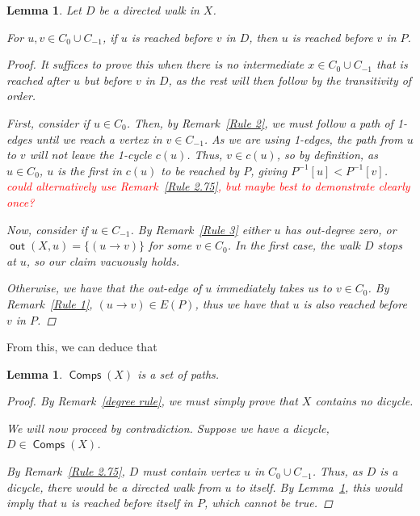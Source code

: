 \documentclass{article}
\newtheorem{lem}[result]{Lemma}
\theoremstyle{definition}
\DeclareMathOperator{\out}{\bm{\mathsf{out}}}
\DeclareMathOperator{\Comp}{\bm{\mathsf{Comps}}}
\newcommand{\hide}[1]{}
\newcommand{\edit}[1]{\textcolor{red}{#1}}
\begin{document}
\begin{lem}\label{walking} Let $D$ be a directed walk in $X$.

For $u,v \in C_0 \cup C_{-1}$, if $u$ is reached before $v$ in $D$, then $u$ is reached before $v$ in $P$.
\begin{proof}

It suffices to prove this when there is no intermediate $x \in C_0 \cup C_{-1}$ that is reached after $u$ but before $v$ in $D$, as the rest will then follow by the transitivity of order.

\vspace{.75em}
First, consider if $u \in C_0$. Then, by Remark~\ref{Rule 2}, we must follow a path of 1-edges until we reach a vertex in $v \in C_{-1}$. As we are using 1-edges, the path from $u$ to $v$ will not leave the 1-cycle $c(u)$. Thus, $v \in c(u)$, so by definition, as $u \in C_0$, $u$ is the first in $c(u)$ to be reached by $P$, giving $P^{-1}[u]<P^{-1}[v]$.\edit{ could alternatively use Remark~\ref{Rule 2.75}, but maybe best to demonstrate clearly once?}

\vspace{.75em}
Now, consider if $u \in C_{-1}$. By Remark~\ref{Rule 3} either $u$ has out-degree zero, or $\out(X,u) = \{(u \to v)\}$ for some $v \in C_0$. In the first case, the walk $D$ stops at $u$, so our claim vacuously holds. 

Otherwise, we have that the out-edge of $u$ immediately takes us to $v \in C_0$. By Remark~\ref{Rule 1}, $(u \to v) \in E(P)$, thus we have that $u$ is also reached before $v$ in $P$.
\end{proof}
\end{lem}

\vspace{1.75em}
From this, we can deduce that 
\begin{lem} \label{path rule} $\Comp(X)$ is a set of paths.

\begin{proof} By Remark~\ref{degree rule}, we must simply prove that $X$ contains no dicycle. \hide{Also by 3.1, we note that directed walks along $X$ are unique, meaning, that starting at a vertex, $v$, there is at most one sequence $v_1,v_2\dots v_i$, such that $v_1 = v$ and $(v_j \to v_{j+1}) \in E(X)$ for all $j$.}

\vspace{0.75em}
We will now proceed by contradiction. Suppose we have a dicycle, $D \in \Comp(X)$.

\vspace{0.75em}
By Remark~\ref{Rule 2.75}, $D$ must contain vertex $u$ in $C_0 \cup C_{-1}$. Thus, as $D$ is a dicycle, there would be a directed walk from $u$ to itself. By Lemma~\ref{walking}, this would imply that $u$ is reached before itself in $P$, which cannot be true.
\end{proof}
\end{lem}
\end{document}
